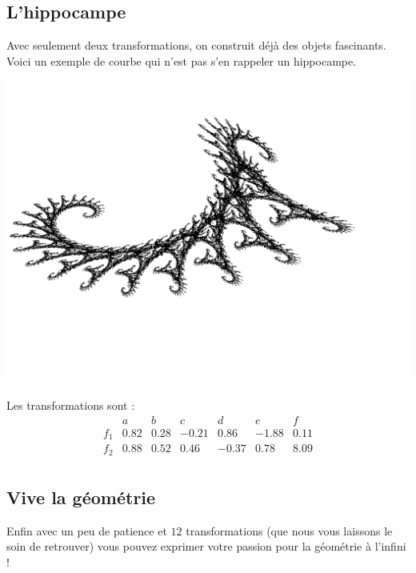 \documentclass[11pt,class=report,crop=false]{standalone}
\begin{document}
\subsection{L'hippocampe}

Avec seulement deux transformations, on construit déjà des objets fascinants.
Voici un exemple de courbe qui n'est pas s'en rappeler un hippocampe.

\begin{center}
 \includegraphics[scale=.5]{images/IFS-dragon1bis.png} 
\end{center}

Les transformations sont :
\begin{displaymath}
\begin{array}{c|cccccc}
     & a & b & c & d & e & f \\
\hline
f_1 & 0.82 & 0.28 & -0.21 & 0.86 & -1.88 & 0.11 \\
\hline
f_2  & 0.88 & 0.52 & 0.46 & -0.37 & 0.78 & 8.09 \\
\end{array}
\end{displaymath}

\subsection{Vive la géométrie}

Enfin avec un peu de patience et $12$ transformations (que nous vous laissons le soin de retrouver)
vous pouvez exprimer votre passion pour la géométrie à l'infini !
\end{document}
